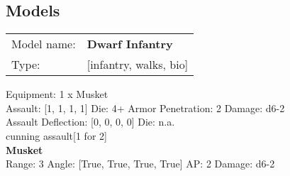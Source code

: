 \clearpage

\subsection{ Models }

\begin{tabular}{ll}
Model name: & {\bf Dwarf Infantry } \\
Type: & [infantry, walks, bio] \\
\end{tabular}

Equipment: 1 x Musket \\

Assault: [1, 1, 1, 1] Die: 4+ Armor Penetration: 2 Damage: d6-2 \\
Assault Deflection: [0, 0, 0, 0] Die: n.a.\\
\indent cunning assault[1 for 2]\\ 
 



{\bf Musket } \\



Range: 3  Angle: [True, True, True, True] AP: 2 Damage: d6-2 \\




 















\clearpage
